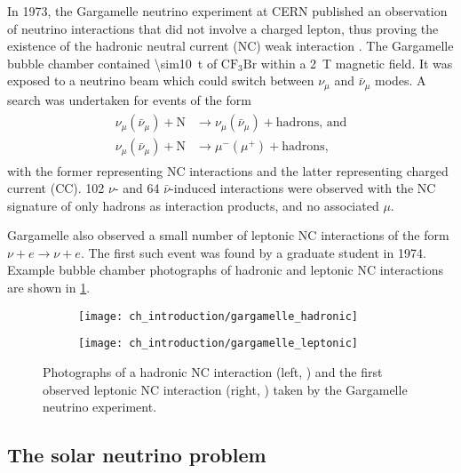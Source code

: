 In 1973, the Gargamelle neutrino experiment at CERN
published an observation of neutrino interactions
that did not involve a charged lepton,
thus proving the existence of the hadronic neutral current (NC) weak interaction
\cite{gargamelle_short,gargamelle}.
The Gargamelle bubble chamber contained \SI{\sim10}{\tonne} of
$\text{CF}_3\text{Br}$ within a \SI{2}{\tesla} magnetic field.
It was exposed to a neutrino beam which could switch
between $\nu_\mu$ and $\bar{\nu}_\mu$ modes.
A search was undertaken for events of the form
\begin{align}\label{eq:neutral_current}
    \begin{split}
        \nu_\mu(\bar{\nu}_\mu) + \text{N} &\to \nu_\mu(\bar{\nu}_\mu)
        + \text{hadrons, and} \\
        \nu_\mu(\bar{\nu}_\mu) + \text{N} &\to \mu^-(\mu^+) + \text{hadrons},
    \end{split}
\end{align}
with the former representing NC interactions
and the latter representing charged current (CC).
102 $\nu$- and 64 $\bar{\nu}$-induced interactions were observed
with the NC signature of only hadrons as interaction products,
and no associated $\mu$.

Gargamelle also observed a small number of leptonic NC interactions
of the form $\nu + e \to \nu + e$.
The first such event was found by a graduate student in 1974.
Example bubble chamber photographs of hadronic
and leptonic NC interactions are shown in \cref{fig:gargamelle}.

\begin{figure}
    \centering
    \begin{subfigure}{0.49\textwidth}
        \texttt{[image: ch\_introduction/gargamelle\_hadronic]}
    \end{subfigure}
    \begin{subfigure}{0.49\textwidth}
        \texttt{[image: ch\_introduction/gargamelle\_leptonic]}
    \end{subfigure}
    \caption{
        Photographs of a hadronic NC interaction (left, \cite{gargamelle_leptonic})
        and the first observed leptonic NC interaction (right, \cite{gargamelle})
        taken by the Gargamelle neutrino experiment.
    }
    \label{fig:gargamelle}
\end{figure}

\subsection{The solar neutrino problem}
\label{subsec:homestake}

